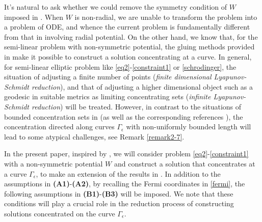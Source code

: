 \documentclass[10pt, reqno]{amsart}
\numberwithin{equation}{section}
\theoremstyle{definition}
\def\G{{\mathfrak G}}
\def\G{\Gamma}
\begin{document}
\smallskip
It's natural to ask whether we could remove the symmetry condition of $W$ imposed in \cite{Zhouyang}.
When $W$ is non-radial, we are unable to transform the problem into a problem of ODE, and whence the current problem is fundamentally different from that in \cite{Zhouyang} involving radial potential.
On the other hand, we know that, for the semi-linear problem with non-symmetric potential, the gluing methods provided in \cite{delPKowWei1} make it possible to construct a solution concentrating at a curve. In general, for semi-linear elliptic problem like \eqref{eq2}-\eqref{constraint1} or \eqref{schrodinger}, the situation of adjusting a finite number of points
({\em finite dimensional Lyapunov-Schmidt reduction}), and that of adjusting a higher dimensional object such as a geodesic in suitable metrics as limiting concentrating sets ({\em infinite Lyapunov-Schmidt reduction}) will be treated.
However, in contrast to the situations of bounded concentration sets in \cite{delPKowWei1} (as well as the corresponding references \cite{machiodi, WangWeiYang, Wangzhao, WeiYang, Wei-xu-yang, SWei-Yang}), the concentration directed along curves $\G_\epsilon$ with non-uniformly bounded length will lead to some atypical challenges, see Remark \ref{remark2-7}.



\smallskip
In the present paper, inspired by \cite{delPKowWei1}, we will consider problem \eqref{eq2}-\eqref{constraint1} with a non-symmetric potential $W$ and construct a solution that concentrates at a curve $\Gamma_\epsilon$, to make an extension of the results in \cite{Zhouyang}.
In addition to the assumptions in {\bf{(A1)}}-{\bf{(A2)}}, by recalling the Fermi coordinates in \eqref{fermi},
the following assumptions in {\bf{(B1)}}-{\bf{(B3)}} will be imposed.
We note that these conditions will play a crucial role in the reduction process of constructing solutions concentrated on the curve $\G_\epsilon$.
\end{document}
